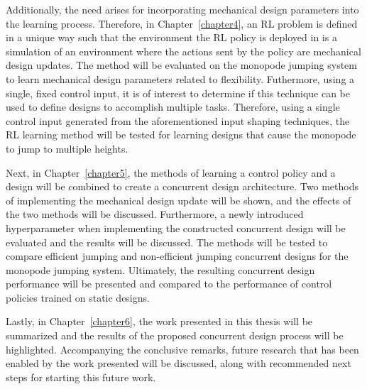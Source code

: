 Additionally, the need arises for incorporating mechanical design parameters into the learning process. Therefore, in Chapter~\ref{chapter4}, an RL problem is defined in a unique way such that the environment the RL policy is deployed in is a simulation of an environment where the actions sent by the policy are mechanical design updates. The method will be evaluated on the monopode jumping system to learn mechanical design parameters related to flexibility. Futhermore, using a single, fixed control input, it is of interest to determine if this technique can be used to define designs to accomplish multiple tasks. Therefore, using a single control input generated from the aforementioned input shaping techniques, the RL learning method will be tested for learning designs that cause the monopode to jump to multiple heights.

Next, in Chapter~\ref{chapter5}, the methods of learning a control policy and a design will be combined to create a concurrent design architecture. Two methods of implementing the mechanical design update will be shown, and the effects of the two methods will be discussed. Furthermore, a newly introduced hyperparameter when implementing the constructed concurrent design will be evaluated and the results will be discussed. The methods will be tested to compare efficient jumping and non-efficient jumping concurrent designs for the monopode jumping system. Ultimately, the resulting concurrent design performance will be presented and compared to the performance of control policies trained on static designs.

Lastly, in Chapter~\ref{chapter6}, the work presented in this thesis will be summarized and the results of the proposed concurrent design process will be highlighted. Accompanying the conclusive remarks, future research that has been enabled by the work presented will be discussed, along with recommended next steps for starting this future work.  